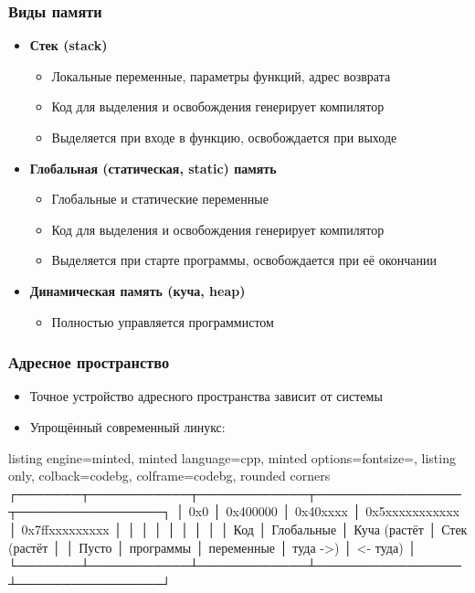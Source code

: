 \documentclass[10pt]{beamer}
\begin{document}
\begin{frame}[fragile]
\frametitle{Виды памяти}
\begin{itemize}
\item \textbf{Стек (stack)}
\begin{itemize}
\item Локальные переменные, параметры функций, адрес возврата
\item Код для выделения и освобождения генерирует компилятор
\item Выделяется при входе в функцию, освобождается при выходе
\end{itemize}
\pause
\item \textbf{Глобальная (статическая, static) память}
\begin{itemize}
\item Глобальные и статические переменные
\item Код для выделения и освобождения генерирует компилятор
\item Выделяется при старте программы, освобождается при её окончании
\end{itemize}
\pause
\item \textbf{Динамическая память (куча, heap)}
\begin{itemize}
\item Полностью управляется программистом
\end{itemize}
\end{itemize}
\end{frame}

\begin{frame}[fragile]
\frametitle{Адресное пространство}
\begin{itemize}
\item Точное устройство адресного пространства зависит от системы
\item Упрощённый современный линукс:
\end{itemize}
\begin{tcblisting}{listing engine=minted, minted language=cpp, minted options={fontsize=\scriptsize}, listing only, colback=codebg, colframe=codebg, rounded corners}
┌───────┬───────────┬────────────┬────────────────┬────────────────┐
│  0x0  │ 0x400000  │ 0x40xxxx   │ 0x5xxxxxxxxxxx │ 0x7ffxxxxxxxxx │
│       │           │            │                │                │
│       │   Код     │ Глобальные │  Куча (растёт  │  Стек (растёт  │
│ Пусто │ программы │ переменные │    туда ->)    │    <- туда)    │
└───────┴───────────┴────────────┴────────────────┴────────────────┘
\end{tcblisting}
\end{frame}
\end{document}
